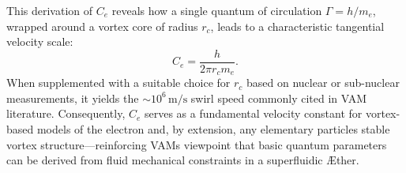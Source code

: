 This derivation of \(C_e\) reveals how a single quantum of circulation \(\Gamma = h/m_e\), wrapped around a vortex core of radius \(r_c\), leads to a characteristic tangential velocity scale:
\[
    C_e = \frac{h}{2\pi r_c m_e}.
\]
When supplemented with a suitable choice for \(r_c\) based on nuclear or sub-nuclear measurements, it yields the \(\sim10^6\,\text{m/s}\) swirl speed commonly cited in VAM literature. Consequently, \(C_e\) serves as a fundamental velocity constant for vortex-based models of the electron and, by extension, any elementary particle\rqs s stable vortex structure—reinforcing VAM\rqs s viewpoint that basic quantum parameters can be derived from fluid mechanical constraints in a superfluidic Æther.